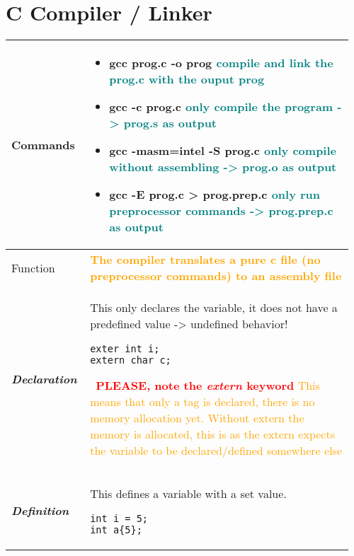 \documentclass[main.tex,fontsize=8pt,paper=a4,paper=portrait,DIV=calc,]{scrartcl}
\begin{document}
\begin{table}[ht!]
\section{C Compiler / Linker}
\begin{tabular}{|m{0.2\linewidth}|m{0.755\linewidth}|}
\hline
Commands &
\begin{itemize}
  \item gcc prog.c -o prog \textcolor{teal}{compile and link the prog.c with the ouput prog}
  \item gcc -c prog.c \textcolor{teal}{only compile the program -> prog.s as output}
  \item gcc -masm=intel -S prog.c \textcolor{teal}{only compile without assembling -> prog.o as output}
  \item gcc -E prog.c > prog.prep.c \textcolor{teal}{only run preprocessor commands -> prog.prep.c as output}
  \vspace{-3mm}
\end{itemize}\\
\hline
Function & 
\textcolor{orange}{\textbf{The compiler translates a pure c file (no preprocessor commands) to an assembly file}}\\
\hline
\textbf{\emph{Declaration}}
&
This only declares the variable, it does not have a predefined value -> undefined behavior!\newline
\begin{lstlisting}
exter int i;
extern char c;
\end{lstlisting}
\,\newline
\textcolor{red}{\textbf{PLEASE, note the \emph{extern} keyword}}\newline
\textcolor{orange}{This means that only a tag is declared, there is no memory allocation yet.\newline
Without extern the memory is allocated, this is as the extern expects the variable to be declared/defined somewhere else}\\
\hline
\textbf{\emph{Definition}}
&
This defines a variable with a set value.\newline
\begin{lstlisting}
int i = 5;
int a{5};
\end{lstlisting}
\\
\hline
\end{tabular}
\end{table}
\pagebreak
\end{document}
